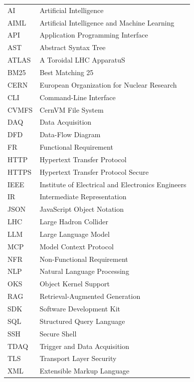 \documentclass[12pt, a4paper]{report}
\begin{document}
\begin{tabular}{ll}
AI & Artificial Intelligence \\
AIML & Artificial Intelligence and Machine Learning \\
API & Application Programming Interface \\
AST & Abstract Syntax Tree \\
ATLAS & A Toroidal LHC ApparatuS \\
BM25 & Best Matching 25 \\
CERN & European Organization for Nuclear Research \\
CLI & Command-Line Interface \\
CVMFS & CernVM File System \\
DAQ & Data Acquisition \\
DFD & Data-Flow Diagram \\
FR & Functional Requirement \\
HTTP & Hypertext Transfer Protocol \\
HTTPS & Hypertext Transfer Protocol Secure \\
IEEE & Institute of Electrical and Electronics Engineers \\
IR & Intermediate Representation \\
JSON & JavaScript Object Notation \\
LHC & Large Hadron Collider \\
LLM & Large Language Model \\
MCP & Model Context Protocol \\
NFR & Non-Functional Requirement \\
NLP & Natural Language Processing \\
OKS & Object Kernel Support \\
RAG & Retrieval-Augmented Generation \\
SDK & Software Development Kit \\
SQL & Structured Query Language \\
SSH & Secure Shell \\
TDAQ & Trigger and Data Acquisition \\
TLS & Transport Layer Security \\
XML & Extensible Markup Language \\
\end{tabular}
\newpage


\end{document}
